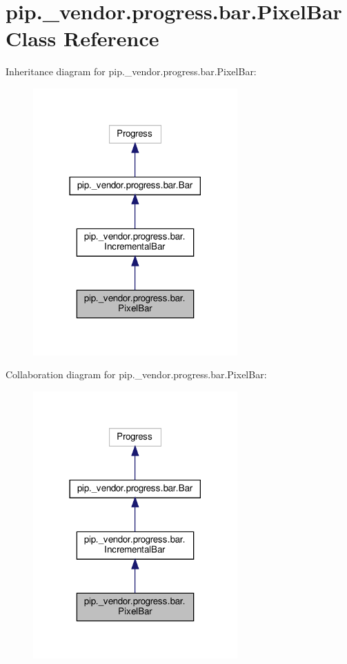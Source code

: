 \hypertarget{classpip_1_1__vendor_1_1progress_1_1bar_1_1PixelBar}{}\section{pip.\+\_\+vendor.\+progress.\+bar.\+Pixel\+Bar Class Reference}
\label{classpip_1_1__vendor_1_1progress_1_1bar_1_1PixelBar}


Inheritance diagram for pip.\+\_\+vendor.\+progress.\+bar.\+Pixel\+Bar\+:
\nopagebreak
\begin{figure}[H]
\begin{center}
\leavevmode
\includegraphics[width=222pt]{classpip_1_1__vendor_1_1progress_1_1bar_1_1PixelBar__inherit__graph}
\end{center}
\end{figure}


Collaboration diagram for pip.\+\_\+vendor.\+progress.\+bar.\+Pixel\+Bar\+:
\nopagebreak
\begin{figure}[H]
\begin{center}
\leavevmode
\includegraphics[width=222pt]{classpip_1_1__vendor_1_1progress_1_1bar_1_1PixelBar__coll__graph}
\end{center}
\end{figure}
